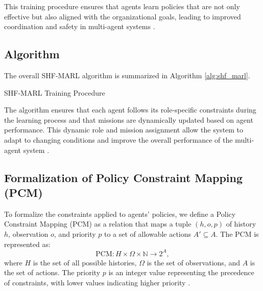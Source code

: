 \documentclass[sigconf,anonymous]{aamas}
\begin{document}
This training procedure ensures that agents learn policies that are not only effective but also aligned with the organizational goals, leading to improved coordination and safety in multi-agent systems \cite{hubner2010moise}.

\subsection{Algorithm}
The overall SHF-MARL algorithm is summarized in Algorithm \ref{alg:shf_marl}.

\begin{algorithm}[h!]
\caption{SHF-MARL Training Procedure}
\label{alg:shf_marl}
\SetAlgoLined
{}
\end{algorithm}


The algorithm ensures that each agent follows its role-specific constraints during the learning process and that missions are dynamically updated based on agent performance. This dynamic role and mission assignment allow the system to adapt to changing conditions and improve the overall performance of the multi-agent system \cite{hubner2010moise}.

\subsection{Formalization of Policy Constraint Mapping (PCM)}
To formalize the constraints applied to agents' policies, we define a Policy Constraint Mapping (PCM) as a relation that maps a tuple $(h, o, p)$ of history $h$, observation $o$, and priority $p$ to a set of allowable actions $A' \subseteq A$. The PCM is represented as:
\[
\text{PCM}: H \times \Omega \times \mathbb{N} \rightarrow 2^A,
\]
where $H$ is the set of all possible histories, $\Omega$ is the set of observations, and $A$ is the set of actions. The priority $p$ is an integer value representing the precedence of constraints, with lower values indicating higher priority \cite{hubner2010moise}.
\end{document}
